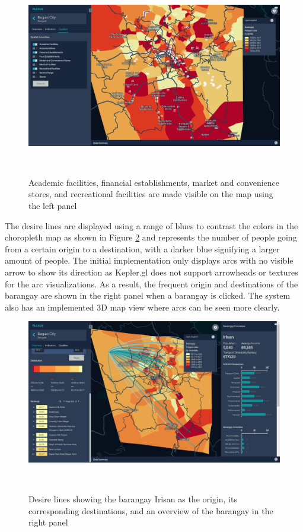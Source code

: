 \documentclass{sigchi}
\begin{document}
\begin{figure}
\centering
  \includegraphics[width=0.9\columnwidth]{figures/kepler9.PNG}
  \caption{Academic facilities, financial establishments, market and convenience stores, and recreational facilities are made visible on the map using the left panel }~\label{fig:KeplerAmenities}
\end{figure}

The desire lines are displayed using a range of blues to contrast the colors in the choropleth map as shown in Figure \ref{fig:KeplerDesireLines} and represents the number of people going from a certain origin to a destination, with a darker blue signifying a larger amount of people. The initial implementation only displays arcs with no visible arrow to show its direction as Kepler.gl does not support arrowheads or textures for the arc visualizations. As a result, the frequent origin and destinations of the barangay are shown in the right panel when a barangay is clicked. The system also has an implemented 3D map view where arcs can be seen more clearly.

\begin{figure}
\centering
  \includegraphics[width=0.9\columnwidth]{figures/overview2.PNG}
  \caption{Desire lines showing the barangay Irisan as the origin, its corresponding destinations, and an overview of the barangay in the right panel }~\label{fig:KeplerDesireLines}
\end{figure}
\end{document}
